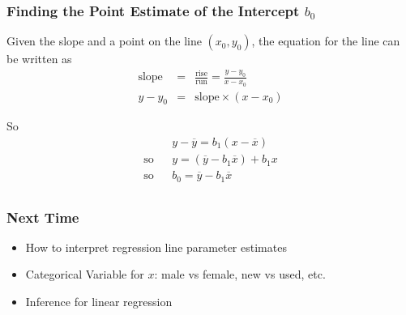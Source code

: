 \documentclass[handout]{beamer}
\newcommand{\blue}[1]{\textcolor{blue2}{#1}}
\newcommand{\xbar}{\overline{x}}
\newcommand{\ybar}{\overline{y}}
\begin{document}
\begin{frame}[fragile]
\frametitle{Finding the Point Estimate of the Intercept $b_0$}
%
%
Given the slope and a point on the line $(x_0, y_0)$, the equation for the line can be written as 
\begin{eqnarray*}
\mbox{slope} &=& \frac{\mbox{rise}}{\mbox{run}} = \frac{y-y_0}{x-x_0}\\
y-y_0 &=& \mbox{slope} \times (x-x_0)
\end{eqnarray*}

\pause So
\begin{eqnarray*}
&& y - \ybar = b_1(x - \xbar)\\
\mbox{so} && y = \left(\ybar - b_1\xbar\right) + b_1 x\\
\mbox{so} && b_0 = \ybar - b_1\xbar\\
\end{eqnarray*}

\end{frame}


\begin{frame}[fragile]
\frametitle{Next Time}

\begin{itemize}
\item How to interpret regression line parameter estimates
\item Categorical Variable for $x$:  male vs female, new vs used, etc.
\item Inference for linear regression
\end{itemize}

\end{frame}


\end{document}

